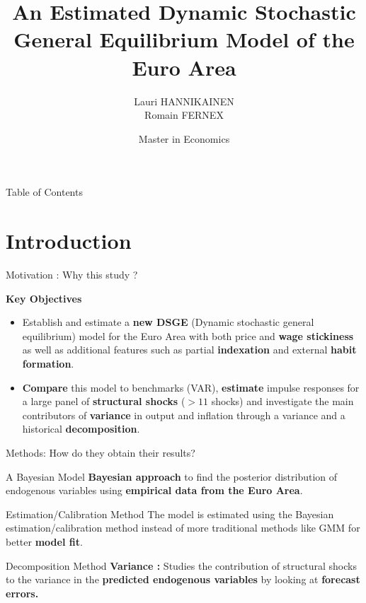 \documentclass{beamer}
\title{\textbf{An Estimated Dynamic Stochastic General Equilibrium Model of the Euro Area}}
\subtitle{Frank Smets \& Raf Wouters\\[1ex]  
\rule{8cm}{0.5pt}}
\author{Lauri HANNIKAINEN \\ Romain FERNEX}
\institute[SciencesPo Paris]{SciencesPo Paris}
\date[Thesis Defense]{Master in Economics}
\begin{document}
\begin{frame}
	\titlepage
\end{frame}

\begin{frame}{Table of Contents}
	\tableofcontents
	\note{}
\end{frame}

\section{Introduction} 

\begin{frame}{Motivation : Why this study ?}
    \begin{center}  
        \Large\textbf{Key Objectives}  
    \end{center}  
    \vspace{0.5em}
	\begin{itemize} 	
		\item Establish and estimate a \textbf{new DSGE} (Dynamic stochastic general equilibrium) model for the Euro Area with both price and \textbf{wage stickiness} as well as additional features such as partial \textbf{indexation} and external \textbf{habit formation}. 
		\item \textbf{Compare} this model to benchmarks (VAR), \textbf{estimate} impulse responses for a large panel of \textbf{structural shocks} ($>11$ shocks) and investigate the main contributors of \textbf{variance} in output and inflation through a variance and a historical \textbf{decomposition}.
	\end{itemize}
\end{frame}

\begin{frame}[label=objectives]{Methods: How do they obtain their results?}    
  \setlength{\parskip}{0pt}    
  \setlength{\topsep}{0pt}    
    \vspace{-0.3cm}
  \begin{simplebox}{A Bayesian Model}    
    \footnotesize  
    \textbf{Bayesian approach} to find the posterior distribution of endogenous variables using \textbf{empirical data from the Euro Area}.  
  \end{simplebox}  
  
  \begin{simplebox}{Estimation/Calibration Method}    
    \footnotesize  
    The model is estimated using the Bayesian estimation/calibration method instead of more traditional methods like GMM for better \textbf{model fit}.  
  \end{simplebox}  
  
  \begin{simplebox}{Decomposition Method}    
    \footnotesize  
    \textbf{Variance :} Studies the contribution of structural shocks to the variance in the \textbf{predicted endogenous variables} by looking at \textbf{forecast errors.} 
  \end{simplebox}    
\end{frame}    
\end{document}
